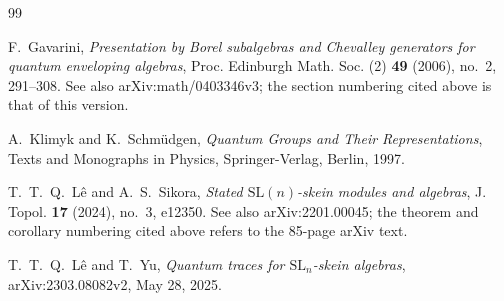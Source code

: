 \documentclass[11pt]{amsart}
\theoremstyle{remark}
\begin{document}
\begin{thebibliography}{99}

F.~Gavarini,
\emph{Presentation by Borel subalgebras and Chevalley generators
for quantum enveloping algebras},
Proc. Edinburgh Math. Soc. (2) \textbf{49} (2006), no.~2,
291--308.
See also arXiv:math/0403346v3; the section numbering cited above
is that of this version.

A.~Klimyk and K.~Schm\"udgen,
\emph{Quantum Groups and Their Representations},
Texts and Monographs in Physics,
Springer-Verlag, Berlin, 1997.

T.~T.~Q.~L\^e and A.~S.~Sikora,
\emph{Stated $\mathrm{SL}(n)$-skein modules and algebras},
J. Topol. \textbf{17} (2024), no.~3, e12350.
See also arXiv:2201.00045; the theorem and corollary numbering
cited above refers to the 85-page arXiv text.

T.~T.~Q.~L\^e and T.~Yu,
\emph{Quantum traces for $\mathrm{SL}_n$-skein algebras},
arXiv:2303.08082v2, May 28, 2025.

\end{thebibliography}
\end{document}
